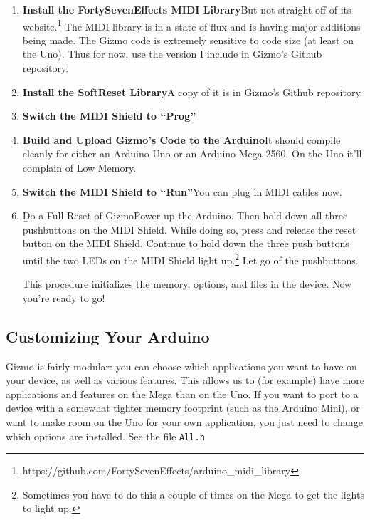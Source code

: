 \documentclass{article}
\begin{document}
\begin{enumerate}
\item {\bf Install the FortySevenEffects MIDI Library}\quad But not straight off of its website.\footnote{https:/\!/github.com/FortySevenEffects/arduino\_midi\_library}  The MIDI library is in a state of flux and is having major additions being made.  The Gizmo code is extremely sensitive to code size (at least on the Uno).  Thus for now, use the version I include in Gizmo's Github repository.

\item {\bf Install the SoftReset Library}\quad A copy of it is in Gizmo's Github repository.

\item {\bf Switch the MIDI Shield to ``Prog''}

\item {\bf Build and Upload Gizmo's Code to the Arduino}\quad  It should compile cleanly for either an Arduino Uno or an Arduino Mega 2560.  On the Uno it'll complain of Low Memory.

\item {\bf Switch the MIDI Shield to ``Run''}\quad  You can plug in MIDI cables now.

\item {\b Do a Full Reset of Gizmo}\quad Power up the Arduino.  Then hold down all three pushbuttons on the MIDI Shield.  While doing so, press and release the reset button on the MIDI Shield.  Continue to hold down the three push buttons until the two LEDs on the MIDI Shield light up.\footnote{Sometimes you have to do this a couple of times on the Mega to get the lights to light up.}  Let go of the pushbuttons.  

This procedure initializes the memory, options, and files in the device.  Now you're ready to go!

\end{enumerate}

\subsection{Customizing Your Arduino}

Gizmo is fairly modular: you can choose which applications you want to have on your device, as well as various features.  This allows us to (for example) have more applications and features on the Mega than on the Uno.  If you want to port to a device with a somewhat tighter memory footprint (such as the Arduino Mini), or want to make room on the Uno for your own application, you just need to change which options are installed.  See the file \texttt{All.h}
\end{document}

